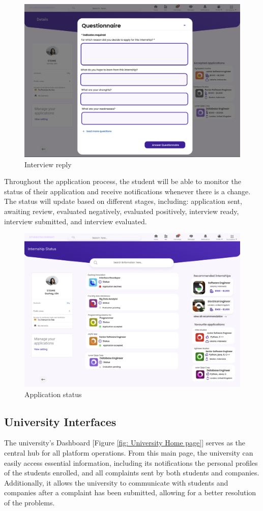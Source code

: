 \begin{figure} [H]
    \centering
    \includegraphics[width=0.5\linewidth]{Interface Images/student interface/Screenshot 2024-12-12 045852.png}
    \caption{Interview reply}
    \label{fig:Interview reply}
\end{figure}

Throughout the application process, the student will be able to monitor the status of their application and receive notifications whenever there is a change. The status will update based on different stages, including: application sent, awaiting review, evaluated negatively, evaluated positively, interview ready, interview submitted, and interview evaluated.

\begin{figure} [H]
    \centering
    \includegraphics[width=0.5\linewidth]{Interface Images/student interface/Screenshot 2024-12-12 050031.png}
    \caption{Application status}
    \label{fig:Application status}
\end{figure}

\subsection{University Interfaces}


The university's Dashboard [Figure \ref{fig: University Home page}] serves as the central hub for all platform operations. From this main page, the university can easily access essential information, including its notifications the personal profiles of the students enrolled, and all complaints sent by both students and companies. Additionally, it allows the university to communicate with students and companies after a complaint has been submitted, allowing for a better resolution of the problems.


